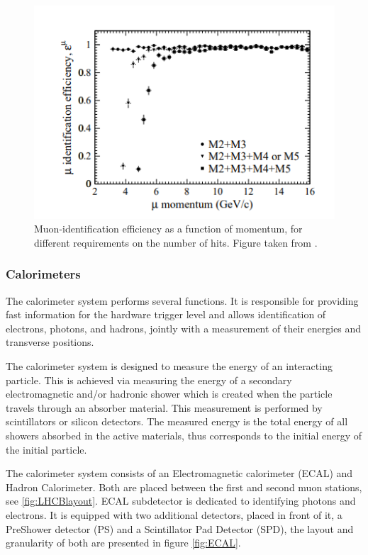 \begin{figure}[h]
\centering
\includegraphics[scale=0.6]{figures/muon_eff.PNG}
\caption{Muon-identification efficiency as a function of momentum, for different requirements on the number of hits. Figure taken from \cite{muon_tdr}.
\label{fig:muon_missidentify}}
\end{figure}



\subsubsection{Calorimeters}

The calorimeter system performs several functions. It is responsible for providing fast information for the hardware trigger level and allows identification of electrons, photons, and hadrons, jointly with a measurement of their energies and transverse positions.

The calorimeter system is designed to measure the energy of an interacting particle. This is achieved via measuring the energy of a secondary electromagnetic and/or hadronic shower which is created when the particle travels through an absorber material. This measurement is performed by scintillators or silicon detectors. The measured energy is the total energy of all showers absorbed in the active materials, thus corresponds to the initial energy of the initial particle. 

The calorimeter system consists of an Electromagnetic calorimeter (ECAL) and Hadron Calorimeter.  Both are placed between the first and second muon stations, see \ref{fig:LHCBlayout}. ECAL subdetector is dedicated to identifying photons and electrons.  It is equipped with two additional detectors, placed in front of it, a PreShower detector (PS) and a Scintillator Pad Detector (SPD), the layout and granularity of both are presented in figure \ref{fig:ECAL}. 


